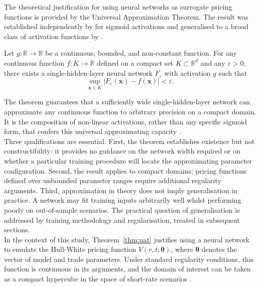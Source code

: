     The theoretical justification for using neural networks as surrogate pricing functions is provided by the Universal Approximation Theorem. The result was established independently by \citet{cybenko1989approximation} for sigmoid activations and generalised to a broad class of activation functions by \citet{hornik1989multilayer, hornik1991approximation}.

    \begin{theorem}
    \label{thm:uat}
    Let $g: \mathbb{R} \to \mathbb{R}$ be a continuous, bounded, and non-constant function. For any continuous function $f: K \to \mathbb{R}$ defined on a compact set $K \subset \mathbb{R}^d$ and any $\varepsilon > 0$, there exists a
    single-hidden-layer neural network $F_\varepsilon$ with activation $g$ such that
    \[
    \sup_{\mathbf{x} \in K} |F_\varepsilon(\mathbf{x}) - f(\mathbf{x})| < \varepsilon.
    \]
    \end{theorem}

    \noindent
    The theorem guarantees that a sufficiently wide single-hidden-layer network can approximate any continuous function to arbitrary precision on a compact domain. It is the composition of non-linear activations, rather than any specific sigmoid form, that confers this universal approximating capacity \citep{hornik1991approximation}. \\

    \noindent
    Three qualifications are essential. First, the theorem establishes existence but not constructibility: it provides no guidance on the network width required or on whether a particular training procedure will locate the approximating parameter configuration. Second, the result applies to compact domains; pricing functions defined over unbounded parameter ranges require additional regularity arguments. Third, approximation in theory does not imply generalisation in practice. A network may fit training inputs arbitrarily well whilst performing poorly on out-of-sample scenarios. The practical question of generalisation is addressed by training methodology and regularisation, treated in subsequent sections. \\

    \noindent
    In the context of this study, Theorem~\ref{thm:uat} justifies using a neural network to emulate the Hull-White pricing function $V(r, t; \boldsymbol{\theta})$, where $\boldsymbol{\theta}$ denotes the vector of model and trade parameters. Under standard regularity conditions, this function is continuous in its arguments, and the domain of interest can be taken as a compact hypercube in the space of short-rate scenarios \citep{mrad2025differential}.


